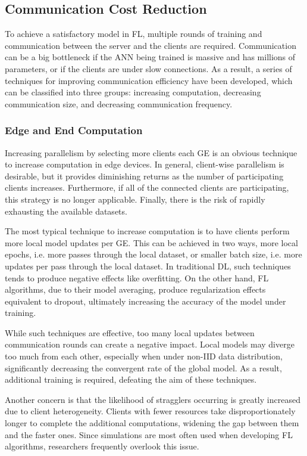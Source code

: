 \subsection{Communication Cost Reduction}
To achieve a satisfactory model in FL, multiple rounds of training and communication between the server and the clients are required. Communication can be a big bottleneck if the ANN being trained is massive and has millions of parameters, or if the clients are under slow connections. As a result, a series of techniques for improving communication efficiency have been developed, which can be classified into three groups: increasing computation, decreasing communication size, and decreasing communication frequency.

\subsubsection{Edge and End Computation}
Increasing parallelism by selecting more clients each GE is an obvious technique to increase computation in edge devices. In general, client-wise parallelism is desirable, but it provides diminishing returns as the number of participating clients increases. Furthermore, if all of the connected clients are participating, this strategy is no longer applicable. Finally, there is the risk of rapidly exhausting the available datasets.

The most typical technique to increase computation is to have clients perform more local model updates per GE. This can be achieved in two ways, more local epochs, i.e. more passes through the local dataset, or smaller batch size, i.e. more updates per pass through the local dataset. In traditional DL, such techniques tends to produce negative effects like overfitting. On the other hand, FL algorithms, due to their model averaging, produce regularization effects equivalent to dropout, ultimately increasing the accuracy of the model under training.

While such techniques are effective, too many local updates between communication rounds can create a negative impact. Local models may diverge too much from each other, especially when under non-IID data distribution, significantly decreasing the convergent rate of the global model. As a result, additional training is required, defeating the aim of these techniques.

Another concern is that the likelihood of stragglers occurring is greatly increased due to client heterogeneity. Clients with fewer resources take disproportionately longer to complete the additional computations, widening the gap between them and the faster ones. Since simulations are most often used when developing FL algorithms, researchers frequently overlook this issue.

